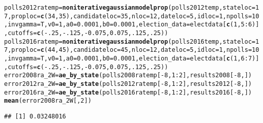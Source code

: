 \documentclass{article}\usepackage[]{graphicx}\usepackage[]{color}
\makeatletter
\newcommand{\hlnum}[1]{\textcolor[rgb]{0.686,0.059,0.569}{#1}}%
\newcommand{\hlopt}[1]{\textcolor[rgb]{0,0,0}{#1}}%
\newcommand{\hlstd}[1]{\textcolor[rgb]{0.345,0.345,0.345}{#1}}%
\newcommand{\hlkwb}[1]{\textcolor[rgb]{0.69,0.353,0.396}{#1}}%
\newcommand{\hlkwc}[1]{\textcolor[rgb]{0.333,0.667,0.333}{#1}}%
\newcommand{\hlkwd}[1]{\textcolor[rgb]{0.737,0.353,0.396}{\textbf{#1}}}%
\newenvironment{kframe}{%
 \def\at@end@of@kframe{}%
 \ifinner\ifhmode%
  \def\at@end@of@kframe{\end{minipage}}%
  \begin{minipage}{\columnwidth}%
 \fi\fi%
 \def\FrameCommand##1{\hskip\@totalleftmargin \hskip-\fboxsep
 \colorbox{shadecolor}{##1}\hskip-\fboxsep
     \hskip-\linewidth \hskip-\@totalleftmargin \hskip\columnwidth}%
 \MakeFramed {\advance\hsize-\width
   \@totalleftmargin\z@ \linewidth\hsize
   \@setminipage}}%
 {\par\unskip\endMakeFramed%
 \at@end@of@kframe}
\newenvironment{knitrout}{}{} %
\makeatother
\begin{document}
\begin{knitrout}
\begin{kframe}
\begin{alltt}
\hlstd{polls2012ratemp} \hlkwb{=} \hlkwd{noniterativegaussianmodelprop}\hlstd{(polls2012temp,} \hlkwc{stateloc} \hlstd{=} \hlnum{17}\hlstd{,} \hlkwc{proploc} \hlstd{=} \hlkwd{c}\hlstd{(}\hlnum{34}\hlstd{,} \hlnum{35}\hlstd{),} \hlkwc{candidateloc} \hlstd{=} \hlnum{35}\hlstd{,}  \hlkwc{nloc} \hlstd{=} \hlnum{12}\hlstd{,} \hlkwc{dateloc} \hlstd{=} \hlnum{5}\hlstd{,} \hlkwc{idloc} \hlstd{=} \hlnum{1}\hlstd{,}  \hlkwc{npolls} \hlstd{=} \hlnum{10}\hlstd{,}\hlkwc{invgamma} \hlstd{= T,} \hlkwc{v0}\hlstd{=}\hlnum{1}\hlstd{,} \hlkwc{a0}\hlstd{=}\hlnum{0.0001}\hlstd{,} \hlkwc{b0}\hlstd{=}\hlnum{0.0001}\hlstd{,}  \hlkwc{election_data} \hlstd{= electdata[}\hlkwd{c}\hlstd{(}\hlnum{1}\hlstd{,} \hlnum{5}\hlopt{:}\hlnum{6}\hlstd{)],} \hlkwc{cutoffs} \hlstd{=} \hlkwd{c}\hlstd{(}\hlopt{-}\hlnum{.25}\hlstd{,} \hlopt{-}\hlnum{.125}\hlstd{,} \hlopt{-}\hlnum{0.075}\hlstd{,} \hlnum{0.075}\hlstd{,} \hlnum{.125}\hlstd{,} \hlnum{.25}\hlstd{))}
\hlstd{polls2016ratemp} \hlkwb{=} \hlkwd{noniterativegaussianmodelprop}\hlstd{(polls2016temp,} \hlkwc{stateloc} \hlstd{=} \hlnum{17}\hlstd{,} \hlkwc{proploc} \hlstd{=} \hlkwd{c}\hlstd{(}\hlnum{44}\hlstd{,} \hlnum{45}\hlstd{),} \hlkwc{candidateloc} \hlstd{=} \hlnum{45}\hlstd{,} \hlkwc{nloc} \hlstd{=} \hlnum{12}\hlstd{,} \hlkwc{dateloc} \hlstd{=} \hlnum{5}\hlstd{,} \hlkwc{idloc} \hlstd{=} \hlnum{1}\hlstd{,}\hlkwc{npolls} \hlstd{=} \hlnum{10}\hlstd{,} \hlkwc{invgamma} \hlstd{= T,} \hlkwc{v0}\hlstd{=}\hlnum{1}\hlstd{,} \hlkwc{a0}\hlstd{=}\hlnum{0.0001}\hlstd{,} \hlkwc{b0}\hlstd{=}\hlnum{0.0001}\hlstd{,} \hlkwc{election_data} \hlstd{= electdata[}\hlkwd{c}\hlstd{(}\hlnum{1}\hlstd{,} \hlnum{6}\hlopt{:}\hlnum{7}\hlstd{)],} \hlkwc{cutoffs} \hlstd{=} \hlkwd{c}\hlstd{(}\hlopt{-}\hlnum{.25}\hlstd{,} \hlopt{-}\hlnum{.125}\hlstd{,} \hlopt{-}\hlnum{0.075}\hlstd{,} \hlnum{0.075}\hlstd{,} \hlnum{.125}\hlstd{,} \hlnum{.25}\hlstd{))}
\hlstd{error2008ra_2W} \hlkwb{=} \hlkwd{ae_by_state}\hlstd{(polls2008ratemp[}\hlopt{-}\hlnum{8}\hlstd{,} \hlnum{1}\hlopt{:}\hlnum{2}\hlstd{], results2008[}\hlopt{-}\hlnum{8}\hlstd{, ])}
\hlstd{error2012ra_2W} \hlkwb{=} \hlkwd{ae_by_state}\hlstd{(polls2012ratemp[}\hlopt{-}\hlnum{8}\hlstd{,} \hlnum{1}\hlopt{:}\hlnum{2}\hlstd{], results2012[}\hlopt{-}\hlnum{8}\hlstd{, ])}
\hlstd{error2016ra_2W} \hlkwb{=} \hlkwd{ae_by_state}\hlstd{(polls2016ratemp[}\hlopt{-}\hlnum{8}\hlstd{,} \hlnum{1}\hlopt{:}\hlnum{2}\hlstd{], results2016[}\hlopt{-}\hlnum{8}\hlstd{, ])}
\hlkwd{mean}\hlstd{(error2008ra_2W[,}\hlnum{2}\hlstd{])}
\end{alltt}
\begin{verbatim}
## [1] 0.03248016

\end{verbatim}
\end{kframe}
\end{knitrout}
\end{document}
